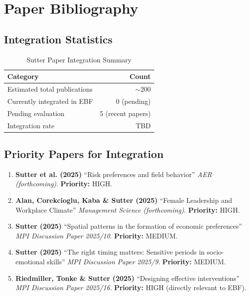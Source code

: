 \section{Paper Bibliography}
\label{sec:sut-papers}

\subsection{Integration Statistics}

\begin{table}[htbp]
\centering
\caption{Sutter Paper Integration Summary}
\label{tab:sut-integration}
\begin{tabular}{@{}lr@{}}
\toprule
\textbf{Category} & \textbf{Count} \\
\midrule
Estimated total publications & $\sim$200 \\
Currently integrated in EBF & 0 (pending) \\
Pending evaluation & 5 (recent papers) \\
Integration rate & TBD \\
\bottomrule
\end{tabular}
\end{table}

\subsection{Priority Papers for Integration}

\begin{enumerate}
    \item \textbf{Sutter et al. (2025)} ``Risk preferences and field behavior''
          \textit{AER (forthcoming)}. \textbf{Priority:} HIGH.

    \item \textbf{Alan, Corekcioglu, Kaba \& Sutter (2025)} ``Female Leadership
          and Workplace Climate'' \textit{Management Science (forthcoming)}.
          \textbf{Priority:} HIGH.

    \item \textbf{Sutter (2025)} ``Spatial patterns in the formation of economic
          preferences'' \textit{MPI Discussion Paper 2025/10}.
          \textbf{Priority:} MEDIUM.

    \item \textbf{Sutter (2025)} ``The right timing matters: Sensitive periods
          in socio-emotional skills'' \textit{MPI Discussion Paper 2025/9}.
          \textbf{Priority:} MEDIUM.

    \item \textbf{Riedmiller, Tonke \& Sutter (2025)} ``Designing effective
          interventions'' \textit{MPI Discussion Paper 2025/16}.
          \textbf{Priority:} HIGH (directly relevant to EBF).
\end{enumerate}


